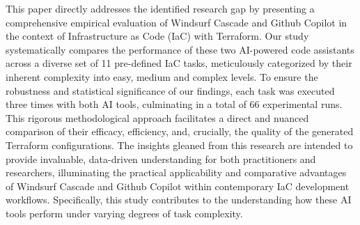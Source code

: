 This paper directly addresses the identified research gap by presenting a comprehensive empirical evaluation of Windsurf Cascade and Github Copilot in the context of Infrastructure as Code (IaC) with Terraform. Our study systematically compares the performance of these two AI-powered code assistants across a diverse set of 11 pre-defined IaC tasks, meticulously categorized by their inherent complexity into easy, medium and complex levels. To ensure the robustness and statistical significance of our findings, each task was executed three times with both AI tools, culminating in a total of 66 experimental runs. This rigorous methodological approach facilitates a direct and nuanced comparison of their efficacy, efficiency, and, crucially, the quality of the generated Terraform configurations. The insights gleaned from this research are intended to provide invaluable, data-driven understanding for both practitioners and researchers, illuminating the practical applicability and comparative advantages of Windsurf Cascade and Github Copilot within contemporary IaC development workflows. Specifically, this study contributes to the understanding how these AI tools perform under varying degrees of task complexity.